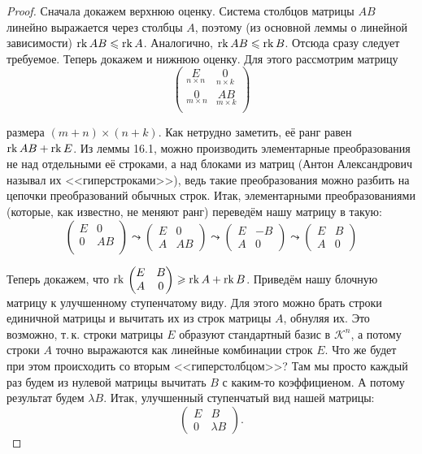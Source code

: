 \begin{proof}
    Сначала докажем верхнюю оценку. Система столбцов матрицы $AB$ линейно выражается через столбцы $A$, поэтому (из основной леммы о линейной зависимости) $\mathrm{rk}\, AB \leqslant \mathrm{rk}\, A$. Аналогично, $\mathrm{rk}\, AB \leqslant \mathrm{rk}\, B$. Отсюда сразу следует требуемое.
    Теперь докажем и нижнюю оценку. Для этого рассмотрим матрицу
    $$
    \begin{pmatrix}
        \underset{n \times n}{E} & \underset{n \times k}{0}\\
        \underset{m \times n}{0} & \underset{m \times k}{AB}\\
    \end{pmatrix}
    $$

    размера $(m + n) \times (n + k)$. Как нетрудно заметить, её ранг равен $\mathrm{rk}\, AB + \mathrm{rk}\, E$. Из леммы 16.1, можно производить элементарные преобразования не над отдельными её строками, а над блоками из матриц (Антон Александрович называл их <<гиперстроками>>), ведь такие преобразования можно разбить на цепочки преобразований обычных строк. Итак, элементарными преобразованиями (которые, как известно, не меняют ранг) переведём нашу матрицу в такую:
    $$
    \begin{pmatrix}
        E & 0\\
        0 & AB\\
    \end{pmatrix} \leadsto
    \begin{pmatrix}
        E & 0\\
        A & AB
    \end{pmatrix} \leadsto
    \begin{pmatrix}
        E & -B\\
        A & 0
    \end{pmatrix} \leadsto
    \begin{pmatrix}
        E & B\\
        A & 0
    \end{pmatrix}
    $$

    Теперь докажем, что
    $
    \mathrm{rk}\,
    \begin{pmatrix}
        E & B\\
        A & 0
    \end{pmatrix} \geqslant \mathrm{rk}\, A + \mathrm{rk}\, B
    $. Приведём нашу блочную матрицу к улучшенному ступенчатому виду. Для этого можно брать строки единичной матрицы и вычитать их из строк матрицы $A$, обнуляя их. Это возможно, т.\,к. строки матрицы $E$ образуют стандартный базис в $\mathcal{K}^n$, а потому строки $A$ точно выражаются как линейные комбинации строк $E$. Что же будет при этом происходить со вторым <<гиперстолбцом>>? Там мы просто каждый раз будем из нулевой матрицы вычитать $B$ с каким-то коэффициеном. А потому результат будем $\lambda B$. Итак, улучшенный ступенчатый вид нашей матрицы:
    $$
    \begin{pmatrix}
        E & B\\
        0 & \lambda B
    \end{pmatrix}.
    $$


\end{proof}
